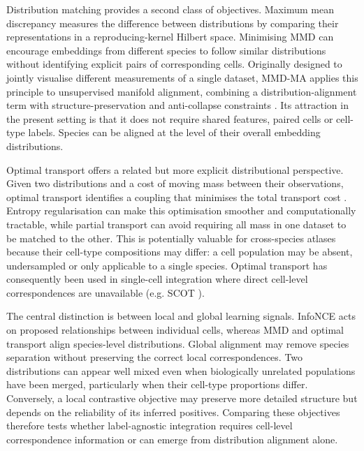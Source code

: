 \documentclass{article}
\begin{document}
Distribution matching provides a second class of objectives. Maximum mean discrepancy measures the difference between distributions by comparing their representations in a reproducing-kernel Hilbert space. Minimising MMD can encourage embeddings from different species to follow similar distributions without identifying explicit pairs of corresponding cells. Originally designed to jointly visualise different measurements of a single dataset, MMD-MA applies this principle to unsupervised manifold alignment, combining a distribution-alignment term with structure-preservation and anti-collapse constraints \cite{MMD-MA}. Its attraction in the present setting is that it does not require shared features, paired cells or cell-type labels. Species can be aligned at the level of their overall embedding distributions.

Optimal transport offers a related but more explicit distributional perspective. Given two distributions and a cost of moving mass between their observations, optimal transport identifies a coupling that minimises the total transport cost \cite{OT}. Entropy regularisation can make this optimisation smoother and computationally tractable, while partial transport can avoid requiring all mass in one dataset to be matched to the other. This is potentially valuable for cross-species atlases because their cell-type compositions may differ: a cell population may be absent, undersampled or only applicable to a single species. Optimal transport has consequently been used in single-cell integration where direct cell-level correspondences are unavailable (e.g. SCOT \cite{SCOT}).

The central distinction is between local and global learning signals. InfoNCE acts on proposed relationships between individual cells, whereas MMD and optimal transport align species-level distributions. Global alignment may remove species separation without preserving the correct local correspondences. Two distributions can appear well mixed even when biologically unrelated populations have been merged, particularly when their cell-type proportions differ. Conversely, a local contrastive objective may preserve more detailed structure but depends on the reliability of its inferred positives. Comparing these objectives therefore tests whether label-agnostic integration requires cell-level correspondence information or can emerge from distribution alignment alone.
\end{document}
